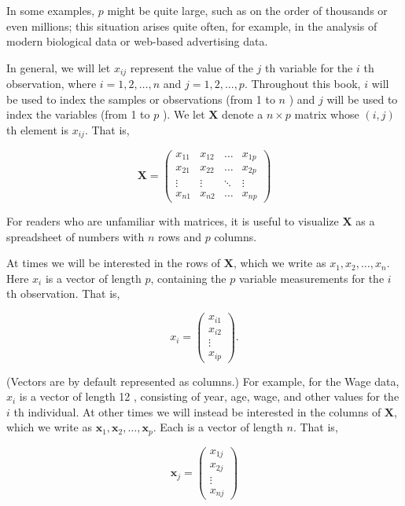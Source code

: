 \documentclass[10pt]{article}
\begin{document}
In some examples, $p$ might be quite large, such as on the order of thousands or even millions; this situation arises quite often, for example, in the analysis of modern biological data or web-based advertising data.


In general, we will let $x_{i j}$ represent the value of the $j$ th variable for the $i$ th observation, where $i=1,2, \ldots, n$ and $j=1,2, \ldots, p$. Throughout this book, $i$ will be used to index the samples or observations (from 1 to $n$ ) and $j$ will be used to index the variables (from 1 to $p$ ). We let $\mathbf{X}$ denote a $n \times p$ matrix whose $(i, j)$ th element is $x_{i j}$. That is,

$$
\mathbf{X}=\left(\begin{array}{cccc}
x_{11} & x_{12} & \ldots & x_{1 p} \\
x_{21} & x_{22} & \ldots & x_{2 p} \\
\vdots & \vdots & \ddots & \vdots \\
x_{n 1} & x_{n 2} & \ldots & x_{n p}
\end{array}\right)
$$

For readers who are unfamiliar with matrices, it is useful to visualize $\mathbf{X}$ as a spreadsheet of numbers with $n$ rows and $p$ columns.

At times we will be interested in the rows of $\mathbf{X}$, which we write as $x_{1}, x_{2}, \ldots, x_{n}$. Here $x_{i}$ is a vector of length $p$, containing the $p$ variable measurements for the $i$ th observation. That is,

\[
x_{i}=\left(\begin{array}{c}
x_{i 1}  \tag{1.1}\\
x_{i 2} \\
\vdots \\
x_{i p}
\end{array}\right) .
\]

(Vectors are by default represented as columns.) For example, for the Wage data, $x_{i}$ is a vector of length 12 , consisting of year, age, wage, and other values for the $i$ th individual. At other times we will instead be interested in the columns of $\mathbf{X}$, which we write as $\mathbf{x}_{1}, \mathbf{x}_{2}, \ldots, \mathbf{x}_{p}$. Each is a vector of length $n$. That is,

$$
\mathbf{x}_{j}=\left(\begin{array}{c}
x_{1 j} \\
x_{2 j} \\
\vdots \\
x_{n j}
\end{array}\right)
$$
\end{document}
